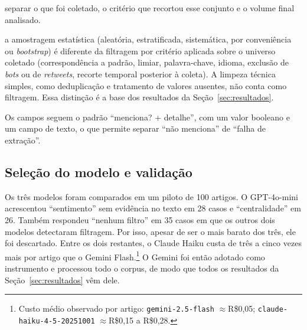 \documentclass[11pt,a4paper]{article}
\begin{document}
\begin{description}[leftmargin=1.4em,style=nextline]
  \item[Universo, filtragem e subconjunto] separar o que foi coletado, o
  critério que recortou esse conjunto e o volume final analisado.
  \item[Filtragem $\neq$ amostragem] a amostragem estatística (aleatória,
  estratificada, sistemática, por conveniência ou \textit{bootstrap}) é
  diferente da filtragem por critério aplicada sobre o universo coletado
  (correspondência a padrão, limiar, palavra-chave, idioma, exclusão de
  \textit{bots} ou de \textit{retweets}, recorte temporal posterior à coleta).
  A limpeza técnica simples, como deduplicação e tratamento de valores
  ausentes, não conta como filtragem. Essa distinção é a base dos resultados da
  Seção~\ref{sec:resultados}.
\end{description}

Os campos seguem o padrão ``menciona? + detalhe'', com um valor booleano e um
campo de texto, o que permite separar ``não menciona'' de ``falha de extração''.

\subsection{Seleção do modelo e validação}
\label{sec:validacao}
Os três modelos foram comparados em um piloto de 100 artigos. O GPT-4o-mini
acrescentou ``sentimento'' sem evidência no texto em 28 casos e ``centralidade'' em 26. Também respondeu ``nenhum filtro'' em 35 casos em que os
outros dois modelos detectaram filtragem. Por isso, apesar de ser o mais barato
dos três, ele foi descartado. Entre os dois restantes, o Claude Haiku custa de
três a cinco vezes mais por artigo que o Gemini Flash.\footnote{Custo médio
observado por artigo: \texttt{gemini-2.5-flash} \(\approx\)R\$0,05;
\texttt{claude-haiku-4-5-20251001} \(\approx\)R\$0,15 a R\$0,28.} O Gemini foi
então adotado como instrumento e processou todo o corpus, de modo que todos os
resultados da Seção~\ref{sec:resultados} vêm dele.
\end{document}
